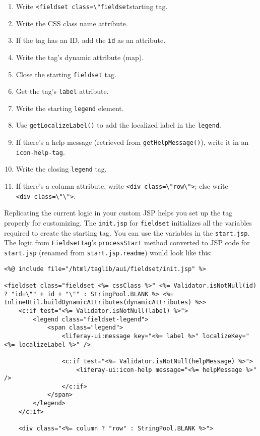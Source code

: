 \begin{enumerate}
\def\labelenumi{\arabic{enumi}.}
\item
  Write
  \texttt{\textless{}fieldset\ class=\textbackslash{}"fieldset}starting
  tag.
\item
  Write the CSS class name attribute.
\item
  If the tag has an ID, add the \texttt{id} as an attribute.
\item
  Write the tag's dynamic attribute (map).
\item
  Close the starting \texttt{fieldset} tag.
\item
  Get the tag's \texttt{label} attribute.
\item
  Write the starting \texttt{legend} element.
\item
  Use \texttt{getLocalizeLabel()} to add the localized label in the
  \texttt{legend}.
\item
  If there's a help message (retrieved from \texttt{getHelpMessage()}),
  write it in an \texttt{icon-help-tag}.
\item
  Write the closing \texttt{legend} tag.
\item
  If there's a column attribute, write
  \texttt{\textless{}div\ class=\textbackslash{}"row\textbackslash{}"\textgreater{}};
  else write
  \texttt{\textless{}div\ class=\textbackslash{}"\textbackslash{}"\textgreater{}}.
\end{enumerate}

Replicating the current logic in your custom JSP helps you set up the
tag properly for customizing. The \texttt{init.jsp} for
\texttt{fieldset} initializes all the variables required to create the
starting tag. You can use the variables in the \texttt{start.jsp}. The
logic from \texttt{FieldsetTag}'s \texttt{processStart} method converted
to JSP code for \texttt{start.jsp} (renamed from
\texttt{start.jsp.readme}) would look like this:

\begin{verbatim}
<%@ include file="/html/taglib/aui/fieldset/init.jsp" %>

<fieldset class="fieldset <%= cssClass %>" <%= Validator.isNotNull(id) ? "id=\"" + id + "\"" : StringPool.BLANK %> <%= InlineUtil.buildDynamicAttributes(dynamicAttributes) %>>
    <c:if test="<%= Validator.isNotNull(label) %>">
        <legend class="fieldset-legend">
            <span class="legend">
                <liferay-ui:message key="<%= label %>" localizeKey="<%= localizeLabel %>" />

                <c:if test="<%= Validator.isNotNull(helpMessage) %>">
                    <liferay-ui:icon-help message="<%= helpMessage %>" />
                </c:if>
            </span>
        </legend>
    </c:if>

    <div class="<%= column ? "row" : StringPool.BLANK %>">
\end{verbatim}

